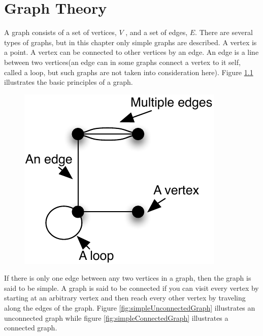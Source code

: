 \chapter {Graph Theory}
\label{chap:graphTheory}

A graph consists of a set of vertices, $V$ \cite[p. 592]{Rosen07}, and a set of edges, $E$. There are several types of graphs, but in this chapter only simple graphs are described. 
A vertex is a point. A vertex can be connected to other vertices by an edge.
An edge is a line between two vertices(an edge can in some graphs connect a vertex to it self, called a loop, but such graphs are not taken into consideration here). Figure \ref{fig:generalDescriptionGraph} illustrates the basic principles of a graph.
\begin{figure}[ht]
	\centering
		\includegraphics[scale = 0.7]{input/pics/generalDescriptionGraph.pdf}
	\caption{}
	\label{fig:generalDescriptionGraph}
\end{figure}

If there is only one edge between any two vertices in a graph, then the graph is said to be simple.
A graph is said to be connected if you can visit every vertex by starting at an arbitrary vertex and then reach every other vertex by traveling along the edges of the graph. Figure \ref{fig:simpleUnconnectedGraph} illustrates an unconnected graph while figure \ref{fig:simpleConnectedGraph} illustrates a connected graph. 

